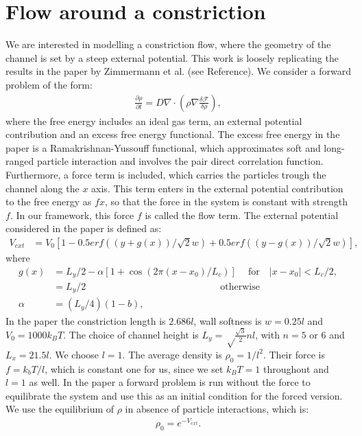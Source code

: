\documentclass[11pt, a4paper]{article}
\theoremstyle{definition}
\begin{document}
\section*{Flow around a constriction}	
	We are interested in modelling a constriction flow, where the geometry of the channel is set by a steep external potential. This work is loosely replicating the results in the paper by Zimmermann et al. (see Reference).	
	We consider a forward problem of the form:
	\begin{align*}
		\frac{\partial \rho}{\partial t} = D \nabla \cdot \left(\rho \nabla \frac{ \delta \mathcal F}{\delta \rho}\right),
	\end{align*}
	where the free energy includes an ideal gas term, an external potential contribution and an excess free energy functional.
	The excess free energy in the paper is a Ramakrishnan-Yussouff functional, which approximates soft and long-ranged particle interaction and involves the pair direct correlation function. 
	Furthermore, a force term is included, which carries the particles trough the channel along the $x$ axis. This term enters in the external potential contribution to the free energy as $fx$, so that the force in the system is constant with strength $f$. In our framework, this force $f$ is called the flow term.
	The external potential considered in the paper is defined as:
	\begin{align*}
		V_{ext} &= V_0 [1 - 0.5erf((y+g(x))/\sqrt 2 w) + 0.5erf((y-g(x))/\sqrt 2 w)],
	\end{align*}
	where
	\begin{align*}
		g(x) &= L_y /2 - \alpha [1+ \cos(2\pi (x - x_0)/L_c)] \quad \ \text{for} \quad |x - x_0| < L_c/2,\\
		&= L_y /2 \qquad \qquad \qquad \qquad\qquad \qquad \qquad\text{otherwise}\\
		\alpha &= (L_y/4)(1-b),
	\end{align*}
	In the paper the constriction length is $2.686 l$, wall softness is $w = 0.25 l$ and $V_0 = 1000 k_BT$. The choice of channel height is $L_y = \sqrt \frac{\sqrt 3}{2} n l$, with $n = 5$ or $6$  and $L_x = 21.5 l$.  We choose $l = 1$.
	The average density is $\rho_0 = 1/l^2$. Their force is $f = k_bT/l$, which is constant one for us, since we set $k_BT =1$ throughout and $l =1$ as well.
	In the paper a forward problem is run without the force to equilibrate the system and use this as an initial condition for the forced version.
	We use the equilibrium of $\rho$ in absence of particle interactions, which is:
	\begin{align*}
		\rho_0 = e^{-V_{ext}}.
	\end{align*}
\end{document}
